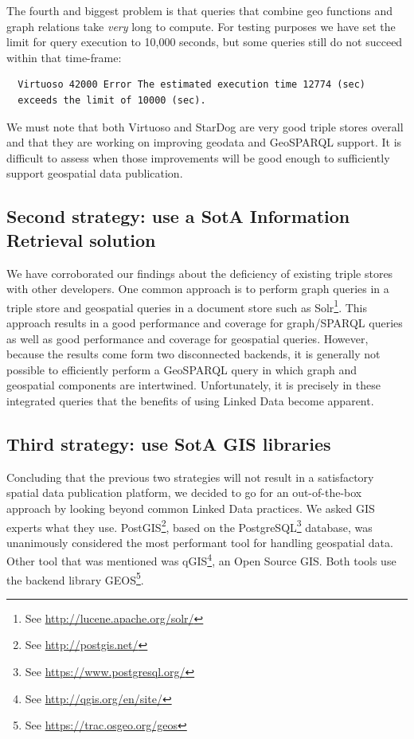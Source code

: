 \documentclass[a4paper]{scrartcl}
\newcommand{\seeUrl}[1]{\footnote{See \mbox{\url{#1}}}}
\begin{document}
The fourth and biggest problem is that queries that combine geo
functions and graph relations take \emph{very} long to compute.  For
testing purposes we have set the limit for query execution to 10,000
seconds, but some queries still do not succeed within that time-frame:

\begin{verbatim}
  Virtuoso 42000 Error The estimated execution time 12774 (sec)
  exceeds the limit of 10000 (sec).
\end{verbatim}

We must note that both Virtuoso and StarDog are very good triple
stores overall and that they are working on improving geodata and
GeoSPARQL support.  It is difficult to assess when those improvements
will be good enough to sufficiently support geospatial data
publication.


\subsection{Second strategy: use a SotA Information Retrieval solution}

We have corroborated our findings about the deficiency of existing
triple stores with other developers.  One common approach is to
perform graph queries in a triple store and geospatial queries in a
document store such as Solr\seeUrl{http://lucene.apache.org/solr/}.
This approach results in a good performance and coverage for
graph/SPARQL queries as well as good performance and coverage for
geospatial queries.  However, because the results come form two
disconnected backends, it is generally not possible to efficiently
perform a GeoSPARQL query in which graph and geospatial components are
intertwined.  Unfortunately, it is precisely in these integrated
queries that the benefits of using Linked Data become apparent.


\subsection{Third strategy: use SotA GIS libraries}

Concluding that the previous two strategies will not result in a
satisfactory spatial data publication platform, we decided to go for
an out-of-the-box approach by looking beyond common Linked Data
practices.  We asked GIS experts what they use.
PostGIS\seeUrl{http://postgis.net/}, based on the
PostgreSQL\seeUrl{https://www.postgresql.org/} database, was
unanimously considered the most performant tool for handling
geospatial data.  Other tool that was mentioned was
qGIS\seeUrl{http://qgis.org/en/site/}, an Open Source GIS.  Both tools
use the backend library GEOS\seeUrl{https://trac.osgeo.org/geos}.
\end{document}
